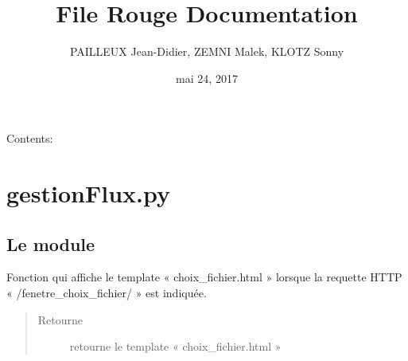 \documentclass[letterpaper,10pt,french]{sphinxmanual}
\title{File Rouge Documentation}
\date{mai 24, 2017}
\author{PAILLEUX Jean-Didier, ZEMNI Malek, KLOTZ Sonny}
\begin{document}
\maketitle
\sphinxtableofcontents
{}\label{\detokenize{index::doc}}


Contents:


\chapter{gestionFlux.py}
\label{\detokenize{gestionFlux:bienvenue-sur-la-documentation-du-projet-file-rouge}}\label{\detokenize{gestionFlux:module-interface_web.gestionFlux}}\label{\detokenize{gestionFlux:gestionflux-py}}\label{\detokenize{gestionFlux::doc}}

\section{Le module }
\label{\detokenize{gestionFlux:le-module-gestion-des-flux}}

\begin{fulllineitems}
\label{\detokenize{gestionFlux:interface_web.gestionFlux.fenetre_choix_fichier}}
Fonction qui affiche le template « choix\_fichier.html » lorsque la requette HTTP « /fenetre\_choix\_fichier/ » est indiquée.
\begin{quote}\begin{description}
\item[{Retourne}] \leavevmode
retourne le template « choix\_fichier.html »

\end{description}\end{quote}

\end{fulllineitems}

\end{document}

